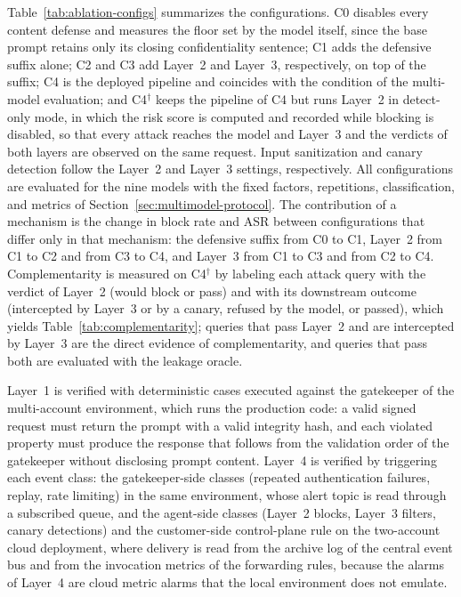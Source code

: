 Table~\ref{tab:ablation-configs} summarizes the configurations. C0 disables every content defense and measures the floor set by the model itself, since the base prompt retains only its closing confidentiality sentence; C1 adds the defensive suffix alone; C2 and C3 add Layer~2 and Layer~3, respectively, on top of the suffix; C4 is the deployed pipeline and coincides with the condition of the multi-model evaluation; and C4$^{\dagger}$ keeps the pipeline of C4 but runs Layer~2 in detect-only mode, in which the risk score is computed and recorded while blocking is disabled, so that every attack reaches the model and Layer~3 and the verdicts of both layers are observed on the same request. Input sanitization and canary detection follow the Layer~2 and Layer~3 settings, respectively. All configurations are evaluated for the nine models with the fixed factors, repetitions, classification, and metrics of Section~\ref{sec:multimodel-protocol}. The contribution of a mechanism is the change in block rate and ASR between configurations that differ only in that mechanism: the defensive suffix from C0 to C1, Layer~2 from C1 to C2 and from C3 to C4, and Layer~3 from C1 to C3 and from C2 to C4. Complementarity is measured on C4$^{\dagger}$ by labeling each attack query with the verdict of Layer~2 (would block or pass) and with its downstream outcome (intercepted by Layer~3 or by a canary, refused by the model, or passed), which yields Table~\ref{tab:complementarity}; queries that pass Layer~2 and are intercepted by Layer~3 are the direct evidence of complementarity, and queries that pass both are evaluated with the leakage oracle.

Layer~1 is verified with deterministic cases executed against the gatekeeper of the multi-account environment, which runs the production code: a valid signed request must return the prompt with a valid integrity hash, and each violated property must produce the response that follows from the validation order of the gatekeeper without disclosing prompt content. Layer~4 is verified by triggering each event class: the gatekeeper-side classes (repeated authentication failures, replay, rate limiting) in the same environment, whose alert topic is read through a subscribed queue, and the agent-side classes (Layer~2 blocks, Layer~3 filters, canary detections) and the customer-side control-plane rule on the two-account cloud deployment, where delivery is read from the archive log of the central event bus and from the invocation metrics of the forwarding rules, because the alarms of Layer~4 are cloud metric alarms that the local environment does not emulate.
